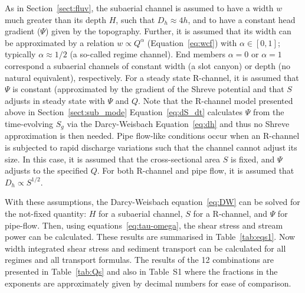 \documentclass[esurf, manuscript]{copernicus}
\begin{document}
As in Section~\ref{sect:fluv}, the subaerial channel is assumed to have a width $w$ much greater than its depth $H$, such that $D_h\approx 4h$, and to have a constant head gradient ($\Psi$) given by the topography.
Further, it is assumed that its width can be approximated by a relation $w \propto Q^\alpha$ (Equation~\ref{eq:wcf}) with $\alpha\in [0,1]$; typically $\alpha \approx 1/2$ (a so-called regime channel).
End members $\alpha=0$ or $\alpha=1$ correspond a  subaerial channels of constant width (a slot canyon) or depth (no natural equivalent), respectively.
% 
For a steady state R-channel, it is assumed that  $\Psi$ is constant (approximated by the gradient of the Shreve \citeyear{shreve1972} potential and that $S$ adjusts in steady state with $\Psi$ and $Q$.
Note that the R-channel model presented above in Section~\ref{sect:sub_mode} Equation~\ref{eq:dS_dt} calculates $\Psi$ from the time-evolving $S_g$ via the Darcy-Weisbach Equation~\ref{eq:dh} and thus no Shreve approximation is then needed.
% 
Pipe flow-like conditions occur when an R-channel is subjected to rapid discharge variations such that the channel cannot adjust its size.
In this case, it is assumed that the cross-sectional area $S$ is fixed, and $\Psi$ adjusts to the specified $Q$.
For both R-channel and pipe flow, it is assumed that $D_h \propto S^{1/2}$.

With these assumptions, the Darcy-Weisbach equation~\eqref{eq:DW} can be solved for the not-fixed quantity: $H$ for a subaerial channel, $S$ for a R-channel, and $\Psi$ for pipe-flow.
Then, using equations~\eqref{eq:tau-omega}, the shear stress and stream power can be calculated.
These results are summarised in Table~\ref{tab:eqs1}.
Now width integrated shear stress and sediment transport can be calculated for all regimes and all transport formulas.
The results of the 12 combinations are presented in Table~\ref{tab:Qs} and also in Table~S1 where the fractions in the exponents are approximately given by decimal numbers for ease of comparison.
\end{document}
